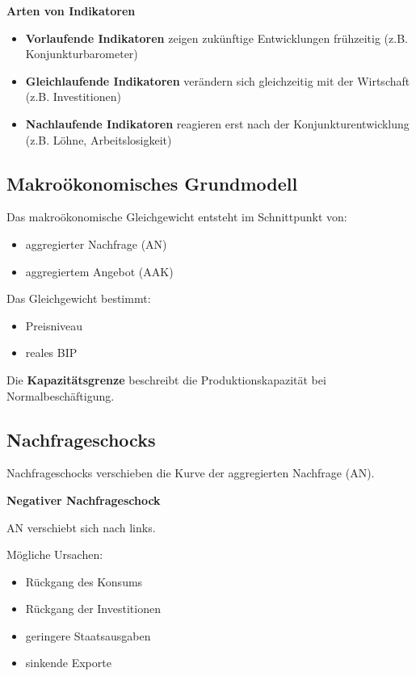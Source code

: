 \textbf{Arten von Indikatoren}

\begin{itemize}
\item \textbf{Vorlaufende Indikatoren}  
zeigen zukünftige Entwicklungen frühzeitig (z.B. Konjunkturbarometer)

\item \textbf{Gleichlaufende Indikatoren}  
verändern sich gleichzeitig mit der Wirtschaft (z.B. Investitionen)

\item \textbf{Nachlaufende Indikatoren}  
reagieren erst nach der Konjunkturentwicklung (z.B. Löhne, Arbeitslosigkeit)
\end{itemize}


\subsection{Makroökonomisches Grundmodell}

Das makroökonomische Gleichgewicht entsteht im Schnittpunkt von:

\begin{itemize}
\item aggregierter Nachfrage (AN)
\item aggregiertem Angebot (AAK)
\end{itemize}

Das Gleichgewicht bestimmt:

\begin{itemize}
\item Preisniveau
\item reales BIP
\end{itemize}

Die \textbf{Kapazitätsgrenze} beschreibt die Produktionskapazität bei Normalbeschäftigung.


\subsection{Nachfrageschocks}

Nachfrageschocks verschieben die Kurve der aggregierten Nachfrage (AN).

\textbf{Negativer Nachfrageschock}

AN verschiebt sich nach links.

Mögliche Ursachen:

\begin{itemize}
\item Rückgang des Konsums
\item Rückgang der Investitionen
\item geringere Staatsausgaben
\item sinkende Exporte
\end{itemize}

